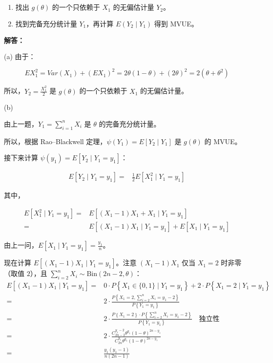 \documentclass[12pt,a4paper]{article}
\begin{document}
\subsection{}

    \begin{enumerate}[label=(\alph*),leftmargin=2.2em]
        \item 找出 $g(\theta)$ 的一个只依赖于 $X_1$ 的无偏估计量 $Y_2$。
        \item 找到完备充分统计量 $Y_1$，再计算 $E(Y_2\mid Y_1)$ 得到 MVUE。
    \end{enumerate}

\begin{answerbox}
\textbf{解答：}

(a) 由于：

$$
EX_1^2 = Var(X_1) + (EX_1)^2 = 2\theta(1-\theta) + (2\theta)^2 = 2(\theta + \theta^2)
$$

所以，$Y_2 = \frac{X_1^2}{2}$ 是 $g(\theta)$ 的一个只依赖于 $X_1$ 的无偏估计量。

(b) 

由上一题，$Y_1 = \sum_{i=1}^{n} X_i$ 是 $\theta$ 的完备充分统计量。

所以，根据 Rao--Blackwell 定理，$\psi(Y_1) =E\left[Y_2 \mid Y_1\right]$ 是 $g(\theta)$ 的 MVUE。

接下来计算 $\psi(y_1) = E\left[Y_2 \mid Y_1 = y_1\right]$：

$$
\begin{aligned}
E\left[Y_2 \mid Y_1 = y_1\right] =& \frac{1}{2} E\left[X_1^2 \mid Y_1 = y_1\right]
\end{aligned}
$$

其中，

$$
\begin{aligned}
E\left[X_1^2 \mid Y_1 = y_1\right] =& E\left[(X_1-1)X_1 + X_1 \mid Y_1 = y_1\right]\\
=& E\left[(X_1-1)X_1 \mid Y_1 = y_1\right] + E\left[X_1 \mid Y_1 = y_1\right]
\end{aligned}
$$

由上一问，$E\left[X_1 \mid Y_1 = y_1\right] = \frac{y_1}{n}$。

现在计算 $E\left[(X_1-1)X_1 \mid Y_1 = y_1\right]$。注意 $(X_1-1)X_1$ 仅当 $X_1=2$ 时非零（取值 $2$），且 $\sum_{i=2}^{n} X_i \sim \text{Bin}(2n-2, \theta)$：
$$
\begin{aligned}
E\left[(X_1-1)X_1 \mid Y_1 = y_1\right] =& 0 \cdot P\left\{X_1 \in \{0,1\}  \mid Y_1 = y_1\right\} + 2 \cdot P\left\{X_1=2 \mid Y_1 = y_1\right\} \\
=& 2 \cdot \frac{P\left\{X_1=2, \sum_{i=2}^{n} X_i = y_1 - 2\right\}}{P\left\{Y_1 = y_1\right\}} \\ 
=& 2 \cdot \frac{P\left\{X_1=2\right\} \cdot P\left\{\sum_{i=2}^{n} X_i = y_1 - 2\right\}}{P\left\{Y_1 = y_1\right\}} \quad \text{独立性}\\ 
=& 2 \cdot \frac{C_{2n-2}^{y_1-2} \theta^{y_1} (1-\theta)^{2n-y_1}}{C_{2n}^{y_1} \theta^{y_1} (1-\theta)^{2n-y_1}} \\
=& \frac{y_1(y_1-1)}{n(2n-1)}
\end{aligned}
$$


\end{answerbox}
\end{document}
